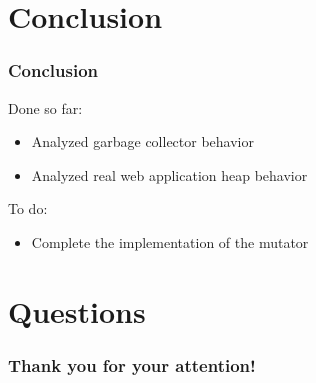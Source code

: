 \documentclass{beamer}
\begin{document}
	\section{Conclusion}
	\begin{frame}
		\frametitle{Conclusion}
		Done so far:
		\begin{itemize}
			\item Analyzed garbage collector behavior
			\item Analyzed real web application heap behavior
		\end{itemize}
		To do:
		\begin{itemize}
			\item Complete the implementation of the mutator
		\end{itemize}
	\end{frame}
	
	\section{Questions}
	\begin{frame}
		\frametitle{Thank you for your attention!}
	\end{frame}
	
\end{document}
